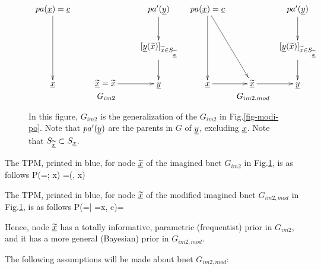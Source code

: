 \begin{figure}[h!]
$$
\begin{array}{cc}
\xymatrix{
pa(\rvx) =\rvc
\ar[dd]
&
&pa'(\rvy)\ar[d]
\\
&&[\rvy(\tilx)]_{\tilx\in S_{\ul{\tilx}}}\ar[d]
\\
\rvx
&\ul{\tilx}=\tilx\ar[r]
&\rvy
}
&
\xymatrix{
pa(\rvx)=\rvc
\ar[dd]\ar[ddr]
&
&pa'(\rvy)\ar[d]
\\
&&[\rvy(\tilx)]_{\tilx\in S_{\ul{\tilx}}}\ar[d]
\\
\rvx\ar[r]
&\ul{\tilx}\ar[r]
&\rvy
}
\\
G_{im2}
 &G_{im2,mod}
\end{array}
$$
\caption{In this figure, $G_{im2}$
is the generalization of the $G_{im2}$
in Fig.\ref{fig-modi-po}.
Note that $pa'({\underline{y}})$ are the parents in $G$ of
${\underline{y}}$, excluding ${\underline{x}}$.
Note that $S_{\underline{{{\widetilde{x}}}}}\subset S_{\underline{x}}$. }
\label{fig-unmodi-modi}
\end{figure}

The TPM, printed in  blue, for node $\underline{{{\widetilde{x}}}}$
of the imagined bnet $G_{im2}$ in Fig.\ref{fig-unmodi-modi}, is as follows
\beq\color{blue}
P(\ul{\tilx}=\tilx; x) =\delta(\tilx, x)
\eeq

The TPM, printed in  blue, for node $\underline{{{\widetilde{x}}}}$
of the modified imagined bnet $G_{im2,mod}$ in Fig.\ref{fig-unmodi-modi},
 is as follows
\beq\color{blue}
P(\ul{\tilx}=\tilx | \rvx=x, c)= 
\eeq

Hence, node $\underline{{{\widetilde{x}}}}$
has a totally informative, parametric (frequentist) prior in $G_{im2}$,
and it has a more general (Bayesian) prior in $G_{im2,mod}$.

The following
assumptions will
be made about bnet $G_{im2, mod}$:

